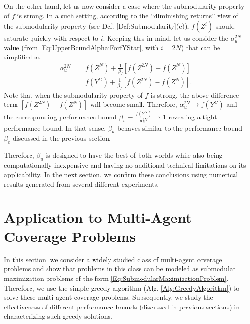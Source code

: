 \documentclass[conference]{IEEEtran}
\begin{document}
On the other hand, let us now consider a case where the submodularity property of $f$ is strong. In a such setting, according to the ``diminishing returns'' view of the submodularity property (see Def. \ref{Def:Submodularity}(c)), $f(Z^i)$ should saturate quickly with respect to $i$. Keeping this in mind, let us consider the $\alpha^{2N}_u$ value (from \eqref{Eq:UpperBoundAlphaiForfYStar}, with $i=2N$) that can be simplified as 
\begin{align}
    \alpha^{2N}_u &= f(Z^N) + \frac{1}{\beta_f}\left[f(Z^{2N})-f(Z^{N})\right]\nonumber\\ 
    &= f(Y^G) + \frac{1}{\beta_f}\left[f(Z^{2N})-f(Z^{N})\right].\nonumber
\end{align}
Note that when the submodularity property of $f$ is strong, the above difference term $\left[f(Z^{2N})-f(Z^{N})\right]$ will become small. Therefore, $\alpha_u^{2N}\rightarrow f(Y^G)$ and the corresponding performance bound $\beta_u = \frac{f(Y^G)}{\alpha_u^{2N}}\rightarrow 1$ revealing a tight performance bound. In that sense, $\beta_u$ behaves similar to the performance bound $\beta_e$ discussed in the previous section. 


Therefore, $\beta_u$ is designed to have the best of both worlds while also being computationally inexpensive and having no additional technical limitations on its applicability. In the next section, we confirm these conclusions using numerical results generated from several different experiments. 





\section{Application to Multi-Agent Coverage Problems}
\label{Sec:ApplicationToCoverageProblem}




In this section, we consider a widely studied class of multi-agent coverage problems \cite{Zhong2011,Sun2019,Welikala2019J1} and show that problems in this class can be modeled as submodular maximization problems of the form \eqref{Eq:SubmodularMaximizationProblem}. Therefore, we use the simple greedy algorithm (Alg. \ref{Alg:GreedyAlgorithm}) to solve these multi-agent coverage problems. Subsequently, we study the effectiveness of different performance bounds (discussed in previous sections) in characterizing such greedy solutions.
\end{document}

